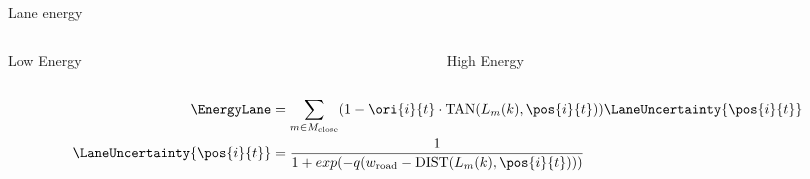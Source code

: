 \newcommand{\carbev}{
  \coordinate (ra) at (1,0.2);
  \coordinate (rb) at (2,0.7);
  \draw [thick,blue] (ra) rectangle (rb);
  \draw [thick,black] let \p1 = (ra), \p2 = (rb) in ($.5*(\x1, \y2) + .5*(\x1, \y1) + (-0.2,0)$) -- ($.5*(ra)+.5*(rb)$);
}
\begin{frame}{Lane energy}
      \centering
  \begin{columns}
    \begin{column}[t]{0.5\textwidth}
      \centering
      Low Energy

    \end{column}
    \begin{column}[t]{0.5\textwidth}
      \centering
      High Energy

    \end{column}
  \end{columns}
  \begin{align}
    \label{eq:laneOrientationEnergy}
    \EnergyLane &= 
    \sum_{m \in M_{\text{close}}}
    (1 - \ori{i}{t} \cdot \text{TAN}(L_{m}(k), \pos{i}{t}) )
    \LaneUncertainty{\pos{i}{t}}
    \\
    \LaneUncertainty{\pos{i}{t}} &=
    \frac{1}{1 + exp(-q(w_{\text{road}} - \text{DIST}(L_{m}(k), \pos{i}{t})))}
  \end{align}
    
\end{frame}

